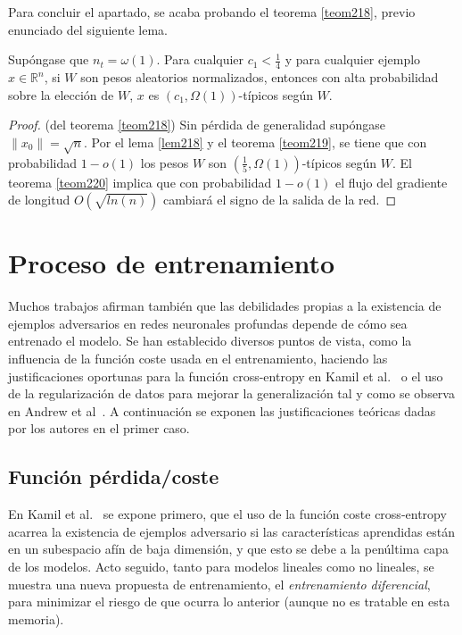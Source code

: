 Para concluir el apartado, se acaba probando el teorema \ref{teom218}, previo enunciado del siguiente lema.

\begin{lema} \label{lem218}
Supóngase que $n_t = \omega(1)$. Para cualquier $c_1 < \frac{1}{4}$ y para cualquier ejemplo $x \in \mathbb{R}^n$, si $W$ son pesos aleatorios normalizados, entonces con alta probabilidad sobre la elección de $W$, $x$ es $(c_1,\Omega(1))$-típicos según $W$.
\end{lema}

\begin{proof}(del teorema \ref{teom218})
Sin pérdida de generalidad supóngase $\|x_0 \| = \sqrt{n}$. Por el lema \ref{lem218} y el teorema \ref{teom219}, se tiene que con probabilidad $1-o(1)$ los pesos $W$ son $\left(\frac{1}{5},\Omega(1) \right)$-típicos según $W$. El teorema \ref{teom220} implica que con probabilidad $1-o(1)$ el flujo del gradiente de longitud $O \left( \sqrt{ln(n)} \right)$ cambiará el signo de la salida de la red.
\end{proof}

\section{Proceso de entrenamiento}
Muchos trabajos afirman también que las debilidades propias a la existencia de ejemplos adversarios en redes neuronales profundas depende de cómo sea entrenado el modelo. Se han establecido diversos puntos de vista, como la influencia de la función coste usada en el entrenamiento, haciendo las justificaciones oportunas para la función cross-entropy en Kamil et al.~\cite{LossFunc} o el uso de la regularización de datos para mejorar la generalización tal y como se observa en Andrew et al~\cite{BatchReg}. A continuación se exponen las justificaciones teóricas dadas por los autores en el primer caso.

\subsection{Función pérdida/coste}
En Kamil et al.~\cite{LossFunc} se expone primero, que el uso de la función coste cross-entropy acarrea la existencia de ejemplos adversario si las características aprendidas están en un subespacio afín de baja dimensión, y que esto se debe a la penúltima capa de los modelos. Acto seguido, tanto para modelos lineales como no lineales, se muestra una nueva propuesta de entrenamiento, el \textit{entrenamiento diferencial}, para minimizar el riesgo de que ocurra lo anterior (aunque no es tratable en esta memoria).

